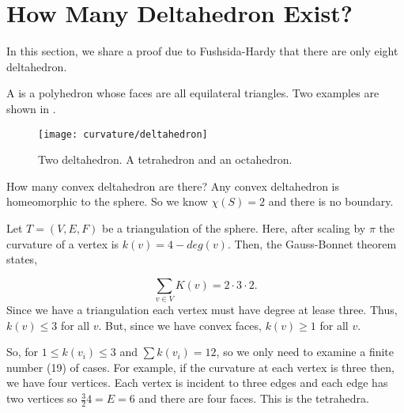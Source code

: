 \section{How Many Deltahedron Exist?}
\label{sec:deltahedron}

In this section, we share a proof due to
Fushsida-Hardy \cite{deltahedron} that there are
only eight deltahedron.

A  is a polyhedron whose
faces are all equilateral triangles. Two examples are shown
in .


\begin{figure}[htb]
\centering
\texttt{[image: curvature/deltahedron]}
\caption{Two deltahedron. A tetrahedron and an octahedron.}
\label{fig:deltahedron}
\end{figure}

How many convex deltahedron are there?
Any convex deltahedron is homeomorphic to the sphere.
So we know $\chi(S)=2$ and there is no boundary.

Let $T=(V,E,F)$  be a triangulation of the sphere.
Here, after scaling by $\pi$ the curvature of a vertex
is $k(v)=4-deg(v).$
Then, the Gauss-Bonnet theorem
states,

$$\sum_{v\in V}K(v)=2\cdot  3\cdot 2.$$
Since we have a triangulation each
vertex must have degree at lease three.
Thus, $k(v)\leq 3$ for all $v$. But, since we have
convex faces, $k(v)\geq 1$ for all $v$.

So, for $1\leq k(v_i)\leq 3$ and  $\sum k(v_i)=12$,
so we only need to examine a finite number (19) of cases.
For example, if the curvature at each vertex is three then,
we have four vertices. Each vertex is incident to three edges
and each edge has two vertices so $\frac{3}{2}4=E=6$ and
there are four faces. This is the tetrahedra.




